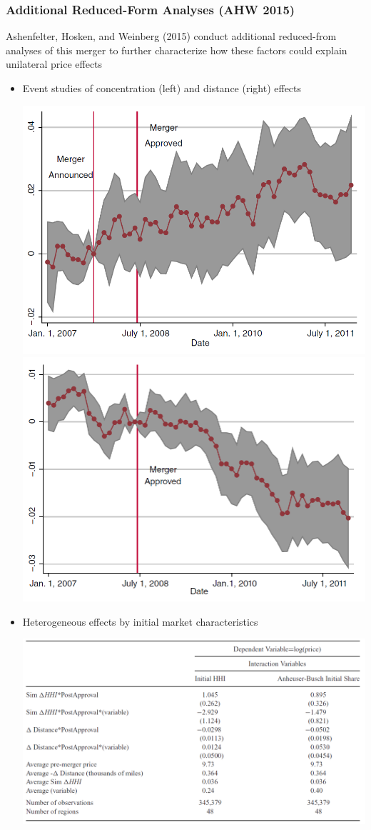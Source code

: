 \documentclass{beamer}
\begin{document}
\begin{frame}\frametitle{Additional Reduced-Form Analyses (AHW 2015)}
    Ashenfelter, Hosken, and Weinberg (2015) conduct additional reduced-from analyses of this merger to further characterize how these factors could explain unilateral price effects
    \begin{itemize}
        \item Event studies of concentration (left) and distance (right) effects
        \begin{center}
            \includegraphics[width=0.25\linewidth]{ahw_fig_5}
            \hspace{8ex}
            \includegraphics[width=0.25\linewidth]{ahw_fig_6}
        \end{center}
        \item Heterogeneous effects by initial market characteristics
        \begin{center}
            \includegraphics[width=0.5\linewidth]{ahw_table_6}
        \end{center}
    \end{itemize}
\end{frame} 
\end{document}
